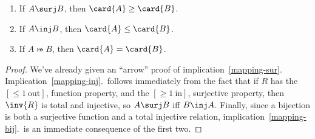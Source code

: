 \begin{lemma}\label{maprule_implies}

\begin{enumerate}

\item\label{mapping-sur} If $A \surj B$, then $\card{A} \geq
  \card{B}$.

\item\label{mapping-inj} If $A \inj B$, then $\card{A} \leq \card{B}$.

\item\label{mapping-bij} If $A \bij B$, then $\card{A} = \card{B}$.
\end{enumerate}

\end{lemma}

\begin{proof}
  We've already given an ``arrow'' proof of
  implication~\ref{mapping-sur}.
  Implication~\ref{mapping-inj}.\ follows immediately from the fact
  that if $R$ has the $[\le 1\ \text{out}]$, function property, and
  the $[\ge 1\ \text{in}]$, surjective property, then $\inv{R}$ is
  total and injective, so $A \surj B$ iff $B \inj A$.  Finally, since
  a bijection is both a surjective function and a total injective
  relation, implication~\ref{mapping-bij}.\ is an immediate
  consequence of the first two.
\end{proof}

